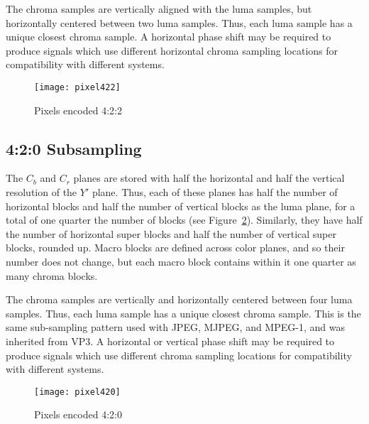 \documentclass[9pt,letterpaper]{book}
\numberwithin{equation}{chapter}
\numberwithin{figure}{chapter}
\numberwithin{table}{chapter}
\begin{document}
The chroma samples are vertically aligned with the luma samples, but
 horizontally centered between two luma samples.
Thus, each luma sample has a unique closest chroma sample.
A horizontal phase shift may be required to produce signals which use different
 horizontal chroma sampling locations for compatibility with different systems.

\begin{figure}[htbp]
\begin{center}
\texttt{[image: pixel422]}
\end{center}
\caption{Pixels encoded 4:2:2}
\label{fig:pixel422}
\end{figure}

%
%
%
%
%
%

\subsection{4:2:0 Subsampling}
\label{sec:420}

The $C_b$ and $C_r$ planes are stored with half the horizontal and half the
 vertical resolution of the $Y'$ plane.
Thus, each of these planes has half the number of horizontal blocks and half
 the number of vertical blocks as the luma plane, for a total of one quarter
 the number of blocks (see Figure~\ref{fig:pixel420}).
Similarly, they have half the number of horizontal super blocks and half the
 number of vertical super blocks, rounded up.
Macro blocks are defined across color planes, and so their number does not
 change, but each macro block contains within it one quarter as many 
 chroma blocks.

The chroma samples are vertically and horizontally centered between four luma
 samples.
Thus, each luma sample has a unique closest chroma sample.
This is the same sub-sampling pattern used with JPEG, MJPEG, and MPEG-1, and
 was inherited from VP3.
A horizontal or vertical phase shift may be required to produce signals which
 use different chroma sampling locations for compatibility with different
 systems.

\begin{figure}[htbp]
\begin{center}
\texttt{[image: pixel420]}
\end{center}
\caption{Pixels encoded 4:2:0}
\label{fig:pixel420}
\end{figure}

%
%
%
%
%
%
%
%
%
%
\end{document}
